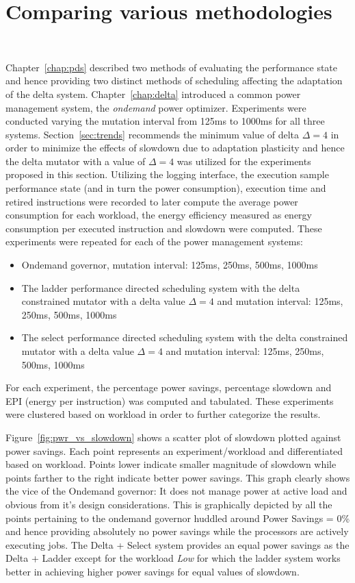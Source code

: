 \section{Comparing various methodologies}~\label{sec:compare}

Chapter~\ref{chap:pds} described two methods of evaluating the performance state and hence
providing two distinct methods of scheduling affecting the adaptation of the delta system.
Chapter~\ref{chap:delta} introduced a common power management system, the \textit{ondemand}
power optimizer. Experiments were conducted varying the mutation interval from 125ms to
1000ms for all three systems. Section~\ref{sec:trends} recommends the minimum value of 
delta $\Delta = 4$ in order to minimize the effects of slowdown due to adaptation plasticity
and hence the delta mutator with a value of $\Delta = 4$ was utilized for the experiments
proposed in this section. 
Utilizing the logging interface, the execution sample 
performance state (and in turn the power consumption), execution time and retired instructions 
were recorded to later compute the average power consumption for each workload, the energy
efficiency measured as energy consumption per executed instruction and slowdown were computed. 
These experiments were repeated for each of the power management systems:
\begin{itemize}
\item Ondemand governor, mutation interval: 125ms, 250ms, 500ms, 1000ms
\item The ladder performance directed scheduling system with the delta constrained mutator with 
a delta value $\Delta = 4$ and mutation interval: 125ms, 250ms, 500ms, 1000ms
\item The select performance directed scheduling system with the delta constrained mutator with 
a delta value $\Delta = 4$ and mutation interval: 125ms, 250ms, 500ms, 1000ms
\end{itemize}
For each experiment, the percentage power savings, percentage slowdown and EPI (energy per instruction)
was computed and tabulated. These experiments were clustered based on workload in order to further 
categorize the results.

Figure~\ref{fig:pwr_vs_slowdown} shows a scatter plot of slowdown plotted against power savings. Each point
represents an experiment/workload and differentiated based on workload. 
Points lower indicate smaller magnitude of slowdown while points farther to the right indicate better power
savings. This graph clearly shows the vice of the Ondemand governor: It does not manage power at active
load and obvious from it's design considerations. This is graphically depicted by all the points pertaining
to the ondemand governor huddled around Power Savings = 0\% and hence providing absolutely no power savings
while the processors are actively executing jobs. The Delta + Select system provides an equal power savings
as the Delta + Ladder except for the workload \textit{Low} for which the ladder system works better in achieving
higher power savings for equal values of slowdown.

